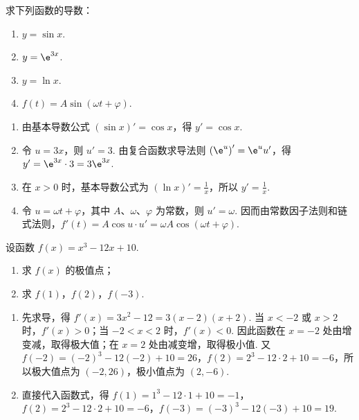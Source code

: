 \begin{problem}
求下列函数的导数：

\begin{enumerate}
\item \(y=\sin x\).
\item \(y=\e^{3x}\).
\item \(y=\ln x\).
\item \(f(t)=A\sin\left(\omega t+\varphi\right)\).
\end{enumerate}
\end{problem}

\begin{solution}
\begin{enumerate}
\item 由基本导数公式 \(\left(\sin x\right)'=\cos x\)，得 \(y'=\cos x\).

\item 令 \(u=3x\)，则 \(u'=3\). 由复合函数求导法则 \(\left(\e^u\right)'=\e^u u'\)，得 \(y'=\e^{3x}\cdot3=3\e^{3x}\).

\item 在 \(x>0\) 时，基本导数公式为 \(\left(\ln x\right)'=\frac{1}{x}\)，所以 \(y'=\frac{1}{x}\).

\item 令 \(u=\omega t+\varphi\)，其中 \(A\)、\(\omega\)、\(\varphi\) 为常数，则 \(u'=\omega\). 因而由常数因子法则和链式法则，\(f'(t)=A\cos u\cdot u'=\omega A\cos\left(\omega t+\varphi\right)\).
\end{enumerate}
\end{solution}

\begin{problem}
设函数 \(f(x)=x^3-12x+10\).

\begin{enumerate}
\item 求 \(f(x)\) 的极值点；

\item 求 \(f(1)\)，\(f(2)\)，\(f(-3)\).
\end{enumerate}
\end{problem}

\begin{solution}
\begin{enumerate}
\item 先求导，得 \(f'(x)=3x^2-12=3\left(x-2\right)\left(x+2\right)\). 当 \(x<-2\) 或 \(x>2\) 时，\(f'(x)>0\)；当 \(-2<x<2\) 时，\(f'(x)<0\). 因此函数在 \(x=-2\) 处由增变减，取得极大值；在 \(x=2\) 处由减变增，取得极小值. 又 \(f(-2)=(-2)^3-12(-2)+10=26\)，\(f(2)=2^3-12\cdot2+10=-6\)，所以极大值点为 \(\left(-2,26\right)\)，极小值点为 \(\left(2,-6\right)\).

\item 直接代入函数式，得 \(f(1)=1^3-12\cdot1+10=-1\)，\(f(2)=2^3-12\cdot2+10=-6\)，\(f(-3)=(-3)^3-12(-3)+10=19\).
\end{enumerate}
\end{solution}

